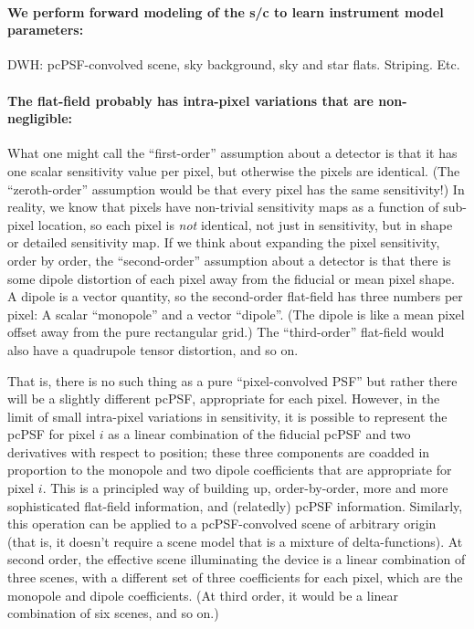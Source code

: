 \documentclass[12pt,preprint]{aastex}
\begin{document}
\paragraph{We perform forward modeling of the s/c to learn instrument model parameters:}

DWH: pcPSF-convolved scene, sky background, sky and star flats.  Striping.  Etc.

\paragraph{The flat-field probably has intra-pixel variations that are non-negligible:}

What one might call the ``first-order'' assumption about a detector is
that it has one scalar sensitivity value per pixel, but otherwise the
pixels are identical.
(The ``zeroth-order'' assumption would be that every pixel has the same
sensitivity!)
In reality, we know that pixels have non-trivial sensitivity maps as a
function of sub-pixel location, so each pixel is \emph{not} identical,
not just in sensitivity, but in shape or detailed sensitivity map.
If we think about expanding the pixel sensitivity, order by order, the
``second-order'' assumption about a detector is that there is some dipole
distortion of each pixel away from the fiducial or mean pixel shape.
A dipole is a vector quantity, so the second-order flat-field has
three numbers per pixel: A scalar ``monopole'' and a vector
``dipole''.
(The dipole is like a mean pixel offset away from the pure rectangular
grid.)
The ``third-order'' flat-field would also have a quadrupole tensor
distortion, and so on.

That is, there is no such thing as a pure ``pixel-convolved PSF'' but
rather there will be a slightly different pcPSF,
appropriate for each pixel.
However, in the limit of small intra-pixel variations in sensitivity,
it is possible to represent the pcPSF for pixel $i$ as a
linear combination of the fiducial pcPSF and two
derivatives with respect to position; these three components are
coadded in proportion to the monopole and two dipole coefficients
that are appropriate for pixel $i$.
This is a principled way of building up, order-by-order, more and more
sophisticated flat-field information, and (relatedly) pcPSF
information.
Similarly, this operation can be applied to a pcPSF-convolved scene of
arbitrary origin (that is, it doesn't require a scene model that is
a mixture of delta-functions).
At second order, the effective scene illuminating the device is a
linear combination of three scenes, with a different set of three
coefficients for each pixel, which are the monopole and dipole
coefficients.
(At third order, it would be a linear combination of six scenes, and
so on.)
\end{document}

